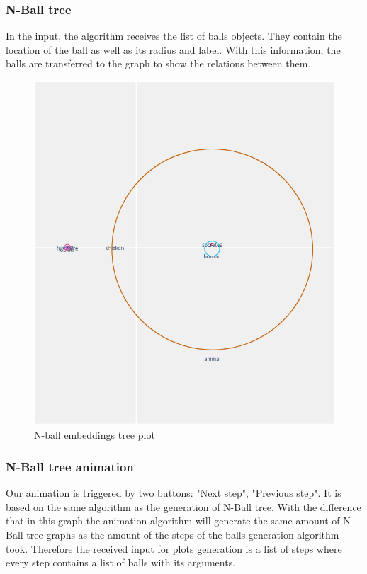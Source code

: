 \documentclass[]{article}
\begin{document}
\subsubsection{N-Ball tree}

In the input, the algorithm receives the list of balls objects. They contain the location of the ball as well as its radius and label. With this information, the balls are transferred to the graph to show the relations between them.

\begin{figure}[H]
	\includegraphics[width=\textwidth]{res/balls_graph.png}
	\caption{N-ball embeddings tree plot}
	\label{fig:balls_graph}
\end{figure}


\subsubsection{N-Ball tree animation}

Our animation is triggered by two buttons: "Next step", "Previous step". It is based on the same algorithm as the generation of N-Ball tree. With the difference that in this graph the animation algorithm will generate the same amount of N-Ball tree graphs as the amount of the steps of the balls generation algorithm took.  Therefore the received input for plots generation is a list of steps where every step contains a list of balls with its arguments.
\end{document}
